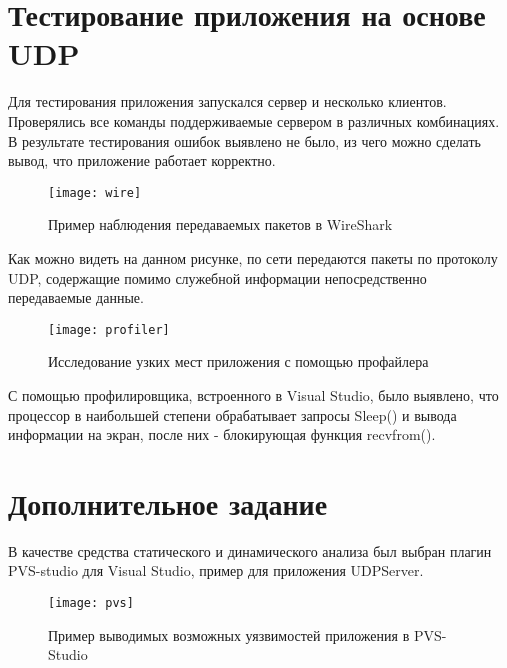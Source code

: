 \section{Тестирование приложения на основе UDP}

Для тестирования приложения запускался сервер и несколько клиентов. Проверялись все команды поддерживаемые сервером в различных комбинациях.
	В результате тестирования ошибок выявлено не было, из чего можно сделать вывод, что приложение работает корректно.

\begin{figure}[H]
	\begin{center}
		\texttt{[image: wire]}
		\caption{Пример наблюдения передаваемых пакетов в WireShark} 
		\label{pic:wire} %
	\end{center}
\end{figure}

Как можно видеть на данном рисунке, по сети передаются пакеты по протоколу UDP, содержащие помимо служебной информации непосредственно передаваемые данные.

\begin{figure}[H]
	\begin{center}
		\texttt{[image: profiler]}
		\caption{Исследование узких мест приложения с помощью профайлера} 
		\label{pic:profiler} %
	\end{center}
\end{figure}

С помощью профилировщика, встроенного в Visual Studio, было выявлено, что процессор в наибольшей степени обрабатывает запросы Sleep() и вывода информации на экран, после них - блокирующая функция recvfrom(). 

\section{Дополнительное задание}

В качестве средства статического и динамического анализа был выбран плагин PVS-studio для Visual Studio, пример для приложения UDPServer.

\begin{figure}[H]
	\begin{center}
		\texttt{[image: pvs]}
		\caption{Пример выводимых возможных уязвимостей приложения в PVS-Studio} 
		\label{pic:pvs} %
	\end{center}
\end{figure}

